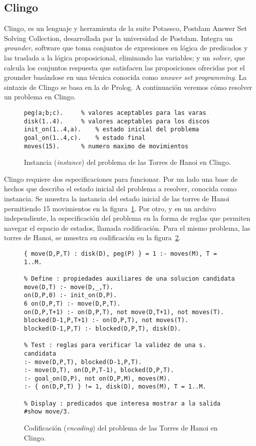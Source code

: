 \documentclass[11pt,captions=nooneline,DIV=14, parskip=full]{scrartcl}
\begin{document}
\subsection{Clingo}
Clingo, es un lenguaje y herramienta de la suite Potassco, Postdam Answer Set Solving Collection, desarrollada por la universidad de Postdam. Integra un \textit{grounder}, software que toma conjuntos de expresiones en lógica de predicados y las traslada a la lógica proposicional, eliminando las variables; y un \textit{solver}, que calcula los conjuntos respuesta que satisfacen las proposiciones ofrecidas por el grounder basándose en una técnica conocida como \textit{answer set programming}. La sintaxis de Clingo se basa en la de Prolog. A continuación veremos cómo resolver un problema en Clingo.

\begin{figure}[!htbp]
\lstset{language=Prolog}
\begin{lstlisting}[frame=single]
peg(a;b;c).		% valores aceptables para las varas
disk(1..4).		% valores aceptables para los discos
init_on(1..4,a).	% estado inicial del problema
goal_on(1..4,c).	% estado final
moves(15).		% numero maximo de movimientos
\end{lstlisting} 
\caption{Instancia (\textit{instance}) del problema de las Torres de Hanoi en Clingo.}
\label{fig:clingoins}
\end{figure}

Clingo requiere dos especificaciones para funcionar. Por un lado una base de hechos que describa el estado inicial del problema a resolver, conocida como instancia. Se muestra la instancia del estado inicial de las torres de Hanoi permitiendo 15 movimientos en la figura~\ref{fig:clingoins}. Por otro, y en un archivo independiente, la especificación del problema en la forma de reglas que permiten navegar el espacio de estados, llamada codificación. Para el mismo problema, las torres de Hanoi, se muestra su codificación en la figura~\ref{fig:clingoenc}.

\begin{figure}[!htbp]
\lstset{language=Prolog}
\begin{lstlisting}[frame=single]
% Generate : descripcion de soluciones candidatas
{ move(D,P,T) : disk(D), peg(P) } = 1 :- moves(M), T = 1..M.

% Define : propiedades auxiliares de una solucion candidata
move(D,T) :- move(D,_,T).
on(D,P,0) :- init_on(D,P).
6 on(D,P,T) :- move(D,P,T).
on(D,P,T+1) :- on(D,P,T), not move(D,T+1), not moves(T).
blocked(D-1,P,T+1) :- on(D,P,T), not moves(T).
blocked(D-1,P,T) :- blocked(D,P,T), disk(D).

% Test : reglas para verificar la validez de una s. candidata
:- move(D,P,T), blocked(D-1,P,T).
:- move(D,T), on(D,P,T-1), blocked(D,P,T).
:- goal_on(D,P), not on(D,P,M), moves(M).
:- { on(D,P,T) } != 1, disk(D), moves(M), T = 1..M.

% Display : predicados que interesa mostrar a la salida
#show move/3.
\end{lstlisting} 
\caption{Codificación (\textit{encoding}) del problema de las Torres de Hanoi en Clingo.}
\label{fig:clingoenc}
\end{figure}
\end{document}
